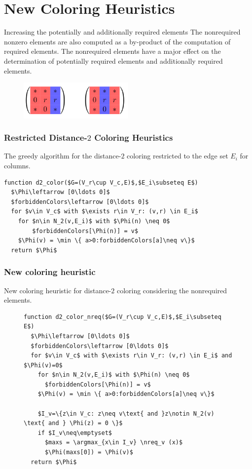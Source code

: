 \documentclass{beamer}
\DeclareMathOperator*{\argmax}{arg\,max}
\newcommand{\nreq}{L}
\begin{document}
\section{New Coloring Heuristics}
\begin{frame}{Increasing the potentially and additionally required elements}
The nonrequired nonzero elements are also computed as a by-product of the computation of required elements.
The nonrequired elements have a major effect on the determination of potentially required elements
and additionally required elements.
\begin{figure}
\centering
\includegraphics[width=0.5\textwidth]{increase}
\end{figure}
\end{frame}

\begin{frame}[fragile]
\frametitle{Restricted Distance-$2$ Coloring Heuristics}
The greedy algorithm for
the distance-$2$ coloring restricted to the edge set $E_i$
for columns.
\begin{lstlisting}[mathescape]
function d2_color($G=(V_r\cup V_c,E)$,$E_i\subseteq E$)
  $\Phi\leftarrow [0\ldots 0]$
  $forbiddenColors\leftarrow [0\ldots 0]$
  for $v\in V_c$ with $\exists r\in V_r: (v,r) \in E_i$
    for $n\in N_2(v,E_i)$ with $\Phi(n) \neq 0$
        $forbiddenColors[\Phi(n)] = v$
    $\Phi(v) = \min \{ a>0:forbiddenColors[a]\neq v\}$
  return $\Phi$
\end{lstlisting}
\end{frame}
\begin{frame}[fragile]
\frametitle{New coloring heuristic}
New coloring heuristic for distance-$2$ coloring
considering the nonrequired elements.
\begin{figure}
\begin{lstlisting}[mathescape]
function d2_color_nreq($G=(V_r\cup V_c,E)$,$E_i\subseteq E$)
  $\Phi\leftarrow [0\ldots 0]$
  $forbiddenColors\leftarrow [0\ldots 0]$
  for $v\in V_c$ with $\exists r\in V_r: (v,r) \in E_i$ and $\Phi(v)=0$
    for $n\in N_2(v,E_i)$ with $\Phi(n) \neq 0$
      $forbiddenColors[\Phi(n)] = v$
    $\Phi(v) = \min \{ a>0:forbiddenColors[a]\neq v\}$

    $I_v=\{z\in V_c: z\neq v\text{ and }z\notin N_2(v) \text{ and } \Phi(z) = 0 \}$
    if $I_v\neq\emptyset$
      $maxs = \argmax_{x\in I_v} \nreq_v (x)$
      $\Phi(maxs[0]) = \Phi(v)$
  return $\Phi$
\end{lstlisting}
\end{figure}
\end{frame}
\end{document}

